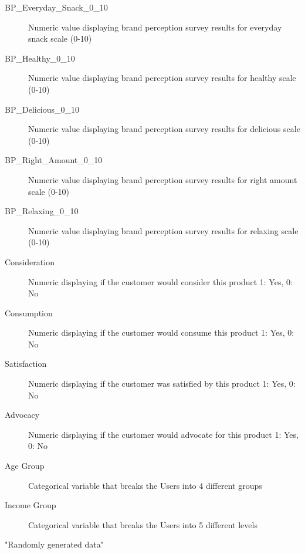 \documentclass[a4paper]{book}
\begin{document}
\begin{Format}
\begin{description}
\item[BP\_Everyday\_Snack\_0\_10] Numeric value displaying brand perception survey results for everyday snack scale (0-10)
\item[BP\_Healthy\_0\_10] Numeric value displaying brand perception survey results for healthy scale (0-10)
\item[BP\_Delicious\_0\_10] Numeric value displaying brand perception survey results for delicious scale (0-10)
\item[BP\_Right\_Amount\_0\_10] Numeric value displaying brand perception survey results for right amount scale (0-10)
\item[BP\_Relaxing\_0\_10] Numeric value displaying brand perception survey results for relaxing scale (0-10)
\item[Consideration] Numeric displaying if the customer would consider this product 1: Yes, 0: No
\item[Consumption] Numeric displaying if the customer would consume this product 1: Yes, 0: No
\item[Satisfaction] Numeric displaying if the customer was satisfied by this product 1: Yes, 0: No
\item[Advocacy] Numeric displaying if the customer would advocate for this product 1: Yes, 0: No
\item[Age Group] Categorical variable that breaks the Users into 4 different groups
\item[Income Group] Categorical variable that breaks the Users into 5 different levels

\end{description}

\end{Format}
%
\begin{Source}\relax
"Randomly generated data"
\end{Source}
\printindex{}
\end{document}
